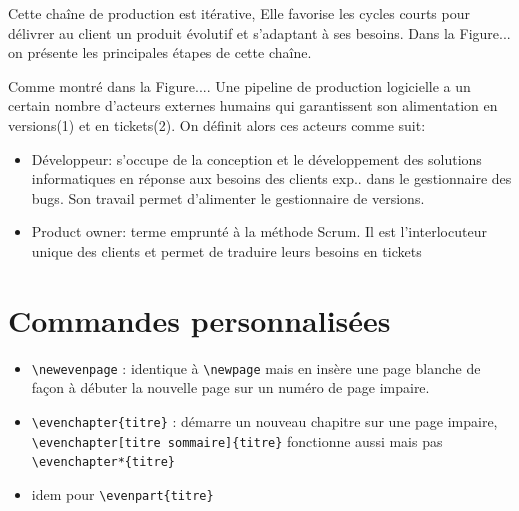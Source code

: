 \documentclass{themeensg}
\newcommand{\ensg}{\textsc{Ensg}}
\begin{document}
Cette chaîne de production est itérative, Elle favorise les cycles courts pour délivrer au client un produit évolutif et s'adaptant à ses besoins. Dans la Figure... on présente les principales étapes de cette chaîne.

Comme montré dans la Figure.... Une pipeline de production logicielle a un certain nombre d'acteurs externes humains qui garantissent son alimentation en versions(1) et en tickets(2). On définit alors ces acteurs comme suit:

\begin{itemize}
\item Développeur: s'occupe de la conception et le développement des solutions informatiques en réponse aux besoins des clients exp.. dans le gestionnaire des bugs. Son travail permet d'alimenter le gestionnaire de versions.
\item Product owner: terme emprunté à la méthode Scrum. Il est l'interlocuteur unique des clients et permet de traduire leurs besoins en tickets 
\end{itemize}

\section{Commandes personnalisées}

\begin{itemize}
\item \verb!\newevenpage! : identique à \verb!\newpage! mais en insère une page blanche de façon à débuter la nouvelle page sur un numéro de page impaire.
\item \verb!\evenchapter{titre}! : démarre un nouveau chapitre sur une page impaire,\\ \verb!\evenchapter[titre sommaire]{titre}! fonctionne aussi mais pas \verb!\evenchapter*{titre}!
\item idem pour \verb!\evenpart{titre}!
\end{itemize}
\end{document}
